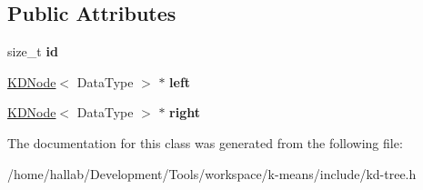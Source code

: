 \subsection*{Public Attributes}
\begin{DoxyCompactItemize}
\item 
\hypertarget{classSimpleCluster_1_1KDNode_a52213b503b615e0bef3c2b636ddd0095}{size\-\_\-t {\bfseries id}}\label{classSimpleCluster_1_1KDNode_a52213b503b615e0bef3c2b636ddd0095}

\item 
\hypertarget{classSimpleCluster_1_1KDNode_ad9f90c910bc2fb96fc9b2c3710d89381}{\hyperlink{classSimpleCluster_1_1KDNode}{K\-D\-Node}$<$ Data\-Type $>$ $\ast$ {\bfseries left}}\label{classSimpleCluster_1_1KDNode_ad9f90c910bc2fb96fc9b2c3710d89381}

\item 
\hypertarget{classSimpleCluster_1_1KDNode_a5e6c93ee710a457cf8d92afc86ffc13f}{\hyperlink{classSimpleCluster_1_1KDNode}{K\-D\-Node}$<$ Data\-Type $>$ $\ast$ {\bfseries right}}\label{classSimpleCluster_1_1KDNode_a5e6c93ee710a457cf8d92afc86ffc13f}

\end{DoxyCompactItemize}


The documentation for this class was generated from the following file\-:\begin{DoxyCompactItemize}
\item 
/home/hallab/\-Development/\-Tools/workspace/k-\/means/include/kd-\/tree.\-h\end{DoxyCompactItemize}
